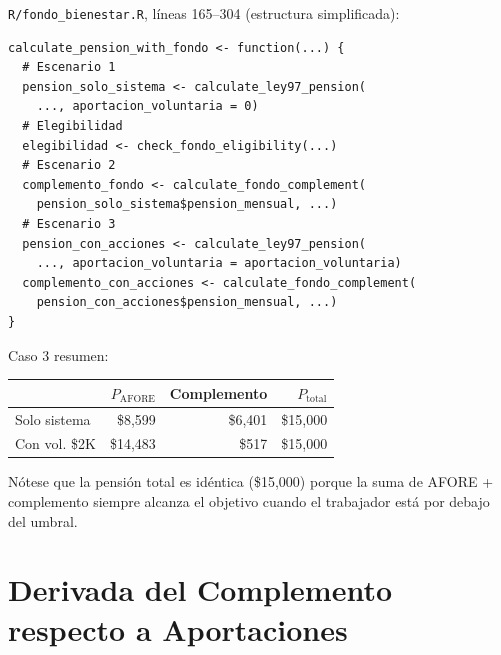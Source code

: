 \documentclass[11pt,a4paper]{report}
\theoremstyle{remark}
\begin{document}
\begin{tcolorbox}[colback=orange!5!white, colframe=orange!75!black, title=\textbf{Aplicaci\'on en C\'odigo}]
\texttt{R/fondo\_bienestar.R}, l\'ineas 165--304 (estructura simplificada):
\begin{lstlisting}
calculate_pension_with_fondo <- function(...) {
  # Escenario 1
  pension_solo_sistema <- calculate_ley97_pension(
    ..., aportacion_voluntaria = 0)
  # Elegibilidad
  elegibilidad <- check_fondo_eligibility(...)
  # Escenario 2
  complemento_fondo <- calculate_fondo_complement(
    pension_solo_sistema$pension_mensual, ...)
  # Escenario 3
  pension_con_acciones <- calculate_ley97_pension(
    ..., aportacion_voluntaria = aportacion_voluntaria)
  complemento_con_acciones <- calculate_fondo_complement(
    pension_con_acciones$pension_mensual, ...)
}
\end{lstlisting}

Caso 3 resumen:
\begin{center}
\begin{tabular}{lrrr}
\toprule
& $P_{\text{AFORE}}$ & Complemento & $P_{\text{total}}$ \\
\midrule
Solo sistema & \$8,599 & \$6,401 & \$15,000 \\
Con vol. \$2K & \$14,483 & \$517 & \$15,000 \\
\bottomrule
\end{tabular}
\end{center}

N\'otese que la pensi\'on total es id\'entica (\$15,000) porque la suma de AFORE + complemento siempre alcanza el objetivo cuando el trabajador est\'a por debajo del umbral.
\end{tcolorbox}

\section{Derivada del Complemento respecto a Aportaciones}
\end{document}

